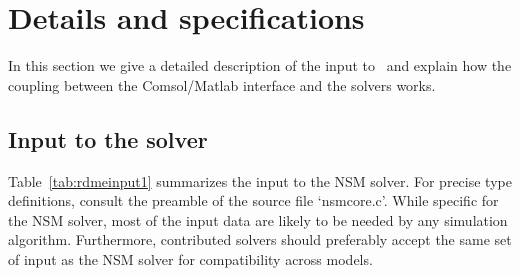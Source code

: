 \section{Details and specifications}
\label{sec:details}

In this section we give a detailed description of the input to \varrs\
and explain how the coupling between the Comsol/Matlab interface and
the solvers works.

\subsection{Input to the solver}
\label{sec:speci}

Table~\ref{tab:rdmeinput1} summarizes the input to the NSM solver. For
precise type definitions, consult the preamble of the source file
`nsmcore.c'. While specific for the NSM solver, most of the input data
are likely to be needed by any simulation algorithm. Furthermore,
contributed solvers should preferably accept the same set of input as
the NSM solver for compatibility across models.

